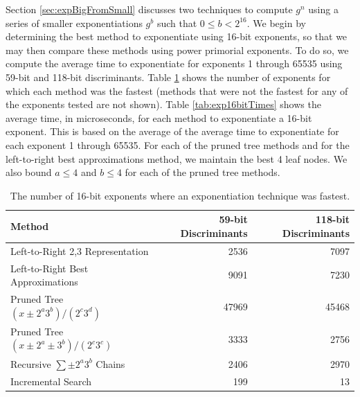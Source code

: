 \documentclass{ucalgthes1}
\theoremstyle{definition}
\begin{document}
Section \ref{sec:expBigFromSmall} discusses two techniques to compute $g^n$ using a series of smaller exponentiations $g^b$ such that $0 \le b < 2^{16}$.  We begin by determining the best method to exponentiate using 16-bit exponents, so that we may then compare these methods using power primorial exponents.  To do so, we compute the average time to exponentiate for exponents 1 through 65535 using 59-bit and 118-bit discriminants.  Table \ref{tab:exp16bitWinners} shows the number of exponents for which each method was the fastest (methods that were not the fastest for any of the exponents tested are not shown).  Table \ref{tab:exp16bitTimes} shows the average time, in microseconds, for each method to exponentiate a 16-bit exponent.  This is based on the average of the average time to exponentiate for each exponent 1 through 65535.  For each of the pruned tree methods and for the left-to-right best approximations method, we maintain the best 4 leaf nodes.  We also bound $a \le 4$ and $b \le 4$ for each of the pruned tree methods.

\begin{table}[htb]
\centering
\begin{tabular}{| l | r | r |}
	\hline
	Method & 59-bit Discriminants & 118-bit Discriminants \\
	\hline
	Left-to-Right 2,3 Representation & 2536 & 7097 \\
	Left-to-Right Best Approximations & 9091 & 7230 \\
	Pruned Tree $(x \pm 2^a3^b)/(2^c3^d)$ & 47969 & 45468 \\
	Pruned Tree $(x \pm 2^a \pm 3^b)/(2^c3^c)$ & 3333 & 2756 \\
	Recursive $\sum \pm 2^a3^b$ Chains & 2406 & 2970 \\
	Incremental Search & 199 & 13 \\
	\hline
\end{tabular}
\caption[Best 16-bit exponentiation techniques.]{The number of 16-bit exponents where an exponentiation technique was fastest.}
\label{tab:exp16bitWinners}
\end{table}
\end{document}
